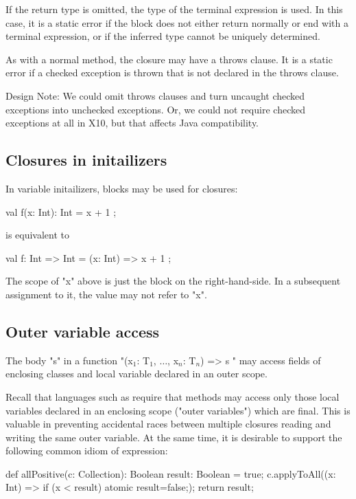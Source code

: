 If the return type is omitted, the type of the terminal
expression is used. In
this case, it is a static error if the block does not either return
normally or end with a terminal expression, or if the inferred type
cannot be uniquely determined.

As with a normal method, the closure may have a throws clause. It is a
static error if a checked exception is thrown that is not declared in
the throws clause.

Design Note: We could omit throws clauses and turn uncaught checked
exceptions into unchecked exceptions. Or, we could not require checked
exceptions at all in X10, but that affects Java compatibility.


\subsection{Closures in initailizers}

In variable initailizers, blocks may be used for closures:

\begin{xten}
val f(x: Int): Int = { x + 1 };
\end{xten}

is equivalent to

\begin{xten}
val f: Int => Int = (x: Int) => { x + 1 };
\end{xten}

The scope of \xcd"x" above is just the block on the
right-hand-side. In a
subsequent assignment to it, the value may not refer to \xcd"x".

\subsection{Outer variable access}

The body \xcd"s" in a function
\xcdmath"(x$_1$: T$_1$, $\dots$, x$_n$: T$_n$) => { s }"
may access fields
of enclosing classes and local variable declared in an outer scope.

Recall that languages such as \java{} require that methods may
access only those local variables declared in an enclosing scope
("outer variables") which are final. This is valuable in
preventing accidental races between multiple closures reading
and writing the same outer variable. At the same time, it is
desirable to support the following common idiom of expression:

\begin{xten}
def allPositive(c: Collection): Boolean {
  result: Boolean = true;
  c.applyToAll((x: Int) => { if (x < result) atomic {result=false;}});
  return result;
}
\end{xten}

